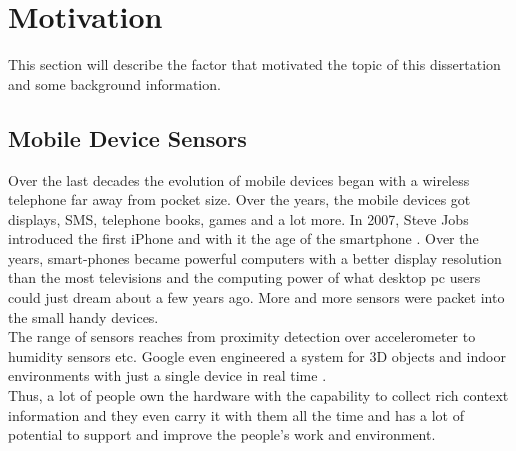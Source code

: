 \section{Motivation}
This section will describe the factor that motivated the topic of this dissertation and some background information. 

\subsection{Mobile Device Sensors}
Over the last decades the evolution of mobile devices began with a wireless telephone far away from pocket size. Over the years, the mobile devices got displays, SMS, telephone books, games and a lot more. In 2007, Steve Jobs introduced the first iPhone and with it the age of the smartphone  \cite{laugesen2010factors}. Over the years, smart-phones became powerful computers with a better display resolution than the most televisions and the computing power of what desktop pc users could just dream about a few years ago. More and more sensors were packet into the small handy devices.\\
The range of sensors reaches from proximity detection over accelerometer to humidity sensors etc. Google even engineered a system for 3D objects and indoor environments with just a single device in real time \cite{schops20153d}.\\
Thus, a lot of people own the hardware with the capability to collect rich context information and they even carry it with them all the time and has a lot of potential to support and improve the people's work and environment.

